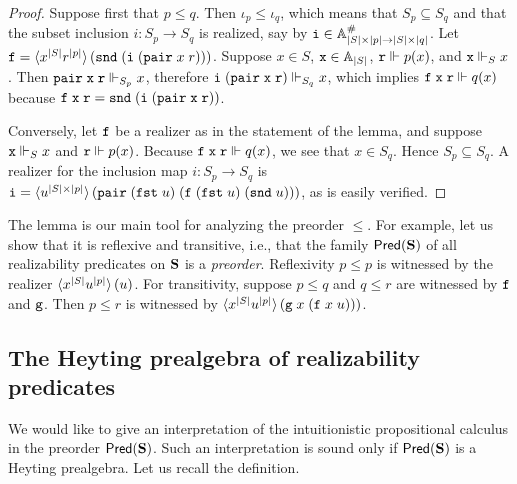 \begin{proof}
  Suppose first that $p \leq q$. Then $\iota_p \leq \iota_q$, which
  means that $S_p \subseteq S_q$ and that the subset inclusion $i :
  S_p \to S_q$ is realized, say by $\mathtt{i} \in \mathbb{A}^{\#}_{|S| \times |p|
    \to |S| \times |q|}$. Let $\mathtt{f} = \langle x^{|S|}
    r^{|p|} \rangle\,(\mathtt{snd}\;(\mathtt{i}\;(\mathtt{pair}\;x\;r)))$. Suppose $x
  \in S$, $\mathtt{x} \in \mathbb{A}_{|S|}$, $\mathtt{r} \Vdash p(x)$, and $\mathtt{x} \Vdash_S
  x$. Then $\mathtt{pair}\;\mathtt{x}\;\mathtt{r} \Vdash_{S_p} x$, therefore
  $\mathtt{i}\;(\mathtt{pair}\;\mathtt{x}\;\mathtt{r}) \Vdash_{S_q} x$, which implies
  $\mathtt{f}\;\mathtt{x}\;\mathtt{r} \Vdash q(x)$ because $\mathtt{f}\;\mathtt{x}\;\mathtt{r} =
  \mathtt{snd}\;(\mathtt{i}\;(\mathtt{pair}\;\mathtt{x}\;\mathtt{r}))$.

  Conversely, let $\mathtt{f}$ be a realizer as in the statement of the
  lemma, and suppose $\mathtt{x} \Vdash_S x$ and $\mathtt{r} \Vdash p(x)$. Because
  $\mathtt{f}\;\mathtt{x}\;\mathtt{r} \Vdash q(x)$, we see that $x \in S_q$. Hence $S_p
  \subseteq S_q$. A realizer for the inclusion map $i : S_p \to S_q$
  is $\mathtt{i} = \langle u^{|S| \times
      |p|} \rangle\,(\mathtt{pair}\;(\mathtt{fst}\;u)\;(\mathtt{f}\;(\mathtt{fst}\;u)\;(\mathtt{snd}\;u)))$,
  as is easily verified.
\end{proof}

The lemma is our main tool for analyzing the preorder $\leq$. For
example, let us show that it is reflexive and transitive, i.e., that
the family $\mathsf{Pred}(\mathbf{S})$ of all realizability predicates on
$\mathbf{S}$ is a \emph{preorder}. Reflexivity $p \leq p$ is witnessed by
the realizer $\langle x^{|S|} u^{|p|} \rangle\,(u)$. For
transitivity, suppose $p \leq q$ and $q \leq r$ are witnessed by
$\mathtt{f}$ and $\mathtt{g}$. Then $p \leq r$ is witnessed by
$\langle x^{|S|} u^{|p|} \rangle\,(\mathtt{g}\;x\;(\mathtt{f}\;x\;u)))$.


\subsection{The Heyting prealgebra of realizability predicates}
\label{sec:heyting-prealgebra}

We would like to give an interpretation of the intuitionistic
propositional calculus in the preorder $\mathsf{Pred}(\mathbf{S})$. Such an
interpretation is sound only if $\mathsf{Pred}(\mathbf{S})$ is a Heyting
prealgebra. Let us recall the definition.

